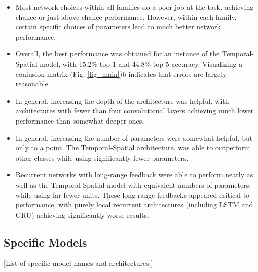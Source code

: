 \begin{itemize}
   \item Most network choices within all families do a poor job at the task, achieving chance or just-above-chance performance. 
   However, within each family, certain specific choices of parameters lead to much better network performance.
   \item Overall, the best performance was obtained for an instance of the Temporal-Spatial model, with 15.2\% top-1 and 44.8\% top-5 accuracy.  
   Visualizing a confusion matrix (Fig. \ref{fig_main})b indicates that errors are largely reasonable. 
   \item In general, increasing the depth of the architecture was helpful, with architectures with fewer than four convolutional layers achieving much lower performance than somewhat deeper ones.
   \item In general, increasing the number of parameters were somewhat helpful, but only to a point. 
   The Temporal-Spatial architecture, was able to outperform other classes while using significantly fewer parameters. 
   \item Recurrent networks with long-range feedback were able to perform nearly as well as the Temporal-Spatial model with equivalent numbers of parameters, while using far fewer units.   
   These long-range feedbacks appeared critical to performance, with purely local recurrent architectures (including LSTM and GRU) achieving significantly worse results.
\end{itemize}
 

\subsection{Specific Models}

[List of specific model names and architectures.]
